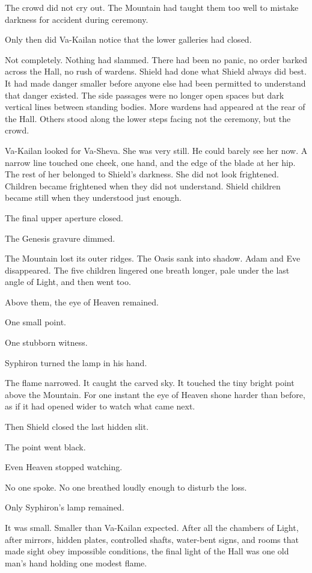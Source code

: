 The crowd did not cry out.
The Mountain had taught them too well to mistake darkness for accident during ceremony.\par
Only then did Va-Kailan notice that the lower galleries had closed.\par
Not completely.
Nothing had slammed.
There had been no panic, no order barked across the Hall, no rush of wardens.
Shield had done what Shield always did best.
It had made danger smaller before anyone else had been permitted to understand that danger existed.
The side passages were no longer open spaces but dark vertical lines between standing bodies.
More wardens had appeared at the rear of the Hall.
Others stood along the lower steps facing not the ceremony, but the crowd.\par
Va-Kailan looked for Va-Sheva.
She was very still.
He could barely see her now.
A narrow line touched one cheek, one hand, and the edge of the blade at her hip.
The rest of her belonged to Shield’s darkness.
She did not look frightened.
Children became frightened when they did not understand.
Shield children became still when they understood just enough.\par
The final upper aperture closed.\par
The Genesis gravure dimmed.\par
The Mountain lost its outer ridges.
The Oasis sank into shadow.
Adam and Eve disappeared.
The five children lingered one breath longer, pale under the last angle of Light, and then went too.\par
Above them, the eye of Heaven remained.\par
One small point.\par
One stubborn witness.\par
Syphiron turned the lamp in his hand.\par
The flame narrowed.
It caught the carved sky.
It touched the tiny bright point above the Mountain.
For one instant the eye of Heaven shone harder than before, as if it had opened wider to watch what came next.\par
Then Shield closed the last hidden slit.\par
The point went black.\par
Even Heaven stopped watching.\par
No one spoke.
No one breathed loudly enough to disturb the loss.\par
Only Syphiron’s lamp remained.\par
It was small.
Smaller than Va-Kailan expected.
After all the chambers of Light, after mirrors, hidden plates, controlled shafts, water-bent signs, and rooms that made sight obey impossible conditions, the final light of the Hall was one old man’s hand holding one modest flame.
